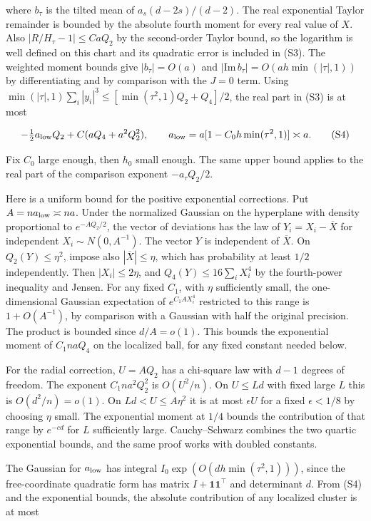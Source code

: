 where $b_\tau$ is the tilted mean of $a_s(d-2s)/(d-2)$. The real exponential Taylor remainder is bounded by the absolute fourth moment for every real value of $X$. Also $|R/H_\tau-1|\le C a Q_2$ by the second-order Taylor bound, so the logarithm is well defined on this chart and its quadratic error is included in (S3). The weighted moment bounds give $|b_\tau|=O(a)$ and $|\mathrm{Im}\,b_\tau|=O(ah\min(|\tau|,1))$ by differentiating and by comparison with the $J=0$ term. Using $\min(|\tau|,1)\sum_i|y_i|^3\le[\min(\tau^2,1)Q_2+Q_4]/2$, the real part in (S3) is at most

\begin{equation}
-\tfrac12 a_{\rm low}Q_2+C(aQ_4+a^2Q_2^2),\qquad
a_{\rm low}=a[1-C_0h\min(\tau^2,1)]\asymp a.
\tag{S4}
\end{equation}

Fix $C_0$ large enough, then $h_0$ small enough. The same upper bound applies to the real part of the comparison exponent $-a_\tau Q_2/2$.

Here is a uniform bound for the positive exponential corrections. Put $A=na_{\rm low}\asymp na$. Under the normalized Gaussian on the hyperplane with density proportional to $e^{-A Q_2/2}$, the vector of deviations has the law of $Y_i=X_i-\overline X$ for independent $X_i\sim N(0,A^{-1})$. The vector $Y$ is independent of $\overline X$. On $Q_2(Y)\le\eta^2$, impose also $|\overline X|\le\eta$, which has probability at least $1/2$ independently. Then $|X_i|\le2\eta$, and $Q_4(Y)\le16\sum_iX_i^4$ by the fourth-power inequality and Jensen. For any fixed $C_1$, with $\eta$ sufficiently small, the one-dimensional Gaussian expectation of $e^{C_1 A X_i^4}$ restricted to this range is $1+O(A^{-1})$, by comparison with a Gaussian with half the original precision. The product is bounded since $d/A=o(1)$. This bounds the exponential moment of $C_1 n a Q_4$ on the localized ball, for any fixed constant needed below.

For the radial correction, $U=AQ_2$ has a chi-square law with $d-1$ degrees of freedom. The exponent $C_1na^2Q_2^2$ is $O(U^2/n)$. On $U\le Ld$ with fixed large $L$ this is $O(d^2/n)=o(1)$. On $Ld<U\le A\eta^2$ it is at most $\epsilon U$ for a fixed $\epsilon<1/8$ by choosing $\eta$ small. The exponential moment at $1/4$ bounds the contribution of that range by $e^{-c d}$ for $L$ sufficiently large. Cauchy--Schwarz combines the two quartic exponential bounds, and the same proof works with doubled constants.

The Gaussian for $a_{\rm low}$ has integral $I_0\exp(O(dh\min(\tau^2,1)))$, since the free-coordinate quadratic form has matrix $I+\mathbf1\mathbf1^\top$ and determinant $d$. From (S4) and the exponential bounds, the absolute contribution of any localized cluster is at most

